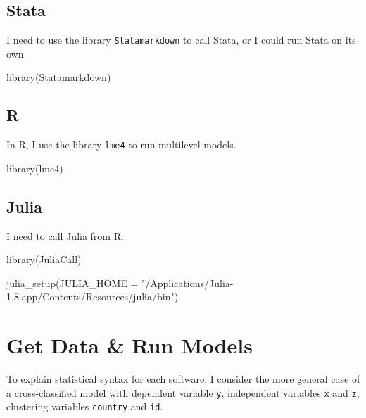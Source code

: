 \documentclass[
  letterpaper,
  DIV=11,
  numbers=noendperiod]{scrreprt}
\newenvironment{Shaded}{\begin{snugshade}}{\end{snugshade}}
\newcommand{\AttributeTok}[1]{\textcolor[rgb]{0.40,0.45,0.13}{#1}}
\newcommand{\FunctionTok}[1]{\textcolor[rgb]{0.28,0.35,0.67}{#1}}
\newcommand{\NormalTok}[1]{\textcolor[rgb]{0.00,0.23,0.31}{#1}}
\newcommand{\StringTok}[1]{\textcolor[rgb]{0.13,0.47,0.30}{#1}}
\begin{document}
\subsection{Stata}

I need to use the library \texttt{Statamarkdown} to call Stata, or I
could run Stata on its own

\begin{Shaded}
\begin{Highlighting}[]
\FunctionTok{library}\NormalTok{(Statamarkdown)}
\end{Highlighting}
\end{Shaded}

\subsection{R}

In R, I use the library \texttt{lme4} to run multilevel models.

\begin{Shaded}
\begin{Highlighting}[]
\FunctionTok{library}\NormalTok{(lme4)}
\end{Highlighting}
\end{Shaded}

\subsection{Julia}

I need to call Julia from R.

\begin{Shaded}
\begin{Highlighting}[]
\FunctionTok{library}\NormalTok{(JuliaCall)}

\FunctionTok{julia\_setup}\NormalTok{(}\AttributeTok{JULIA\_HOME =} \StringTok{"/Applications/Julia{-}1.8.app/Contents/Resources/julia/bin"}\NormalTok{)}
\end{Highlighting}
\end{Shaded}

\hypertarget{get-data-run-models-1}{%
\section{Get Data \& Run Models}\label{get-data-run-models-1}}

To explain statistical syntax for each software, I consider the more
general case of a cross-classified model with dependent variable
\texttt{y}, independent variables \texttt{x} and \texttt{z}, clustering
variables \texttt{country} and \texttt{id}.
\end{document}
